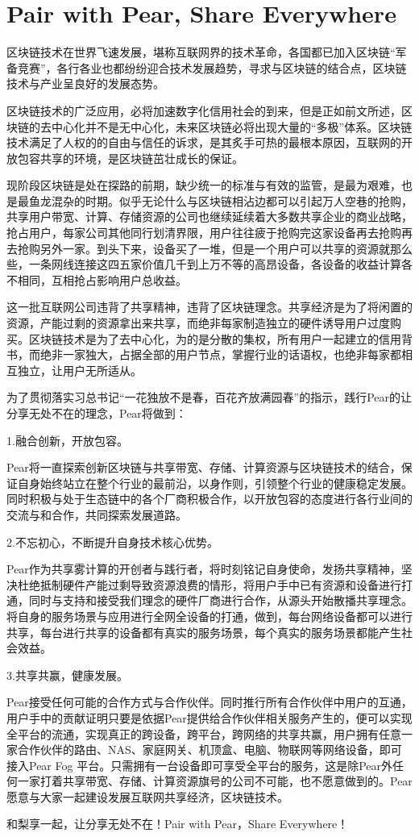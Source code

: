 \chapter{Pair with Pear, Share Everywhere}
区块链技术在世界飞速发展，堪称互联网界的技术革命，各国都已加入区块链“军备竞赛”，各行各业也都纷纷迎合技术发展趋势，寻求与区块链的结合点，区块链技术与产业呈良好的发展态势。\par
区块链技术的广泛应用，必将加速数字化信用社会的到来，但是正如前文所述，区块链的去中心化并不是无中心化，未来区块链必将出现大量的“多极”体系。区块链技术满足了人权的的自由与信任的诉求，是其炙手可热的最根本原因，互联网的开放包容共享的环境，是区块链茁壮成长的保证。\par 
现阶段区块链是处在探路的前期，缺少统一的标准与有效的监管，是最为艰难，也是最鱼龙混杂的时期。似乎无论什么与区块链相沾边都可以引起万人空巷的抢购，共享用户带宽、计算、存储资源的公司也继续延续着大多数共享企业的商业战略，抢占用户，每家公司其他同行划清界限，用户往往疲于抢购完这家设备再去抢购再去抢购另外一家。到头下来，设备买了一堆，但是一个用户可以共享的资源就那么些，一条网线连接这四五家价值几千到上万不等的高昂设备，各设备的收益计算各不相同，互相抢占影响用户总收益。\par 
这一批互联网公司违背了共享精神，违背了区块链理念。共享经济是为了将闲置的资源，产能过剩的资源拿出来共享，而绝非每家制造独立的硬件诱导用户过度购买。区块链技术是为了去中心化，为的是分散的集权，所有用户一起建立的信用背书，而绝非一家独大，占据全部的用户节点，掌握行业的话语权，也绝非每家都相互独立，让用户无所适从。\par
为了贯彻落实习总书记“一花独放不是春，百花齐放满园春”的指示，践行Pear的让分享无处不在的理念，Pear将做到：\par
1.融合创新，开放包容。\par
Pear将一直探索创新区块链与共享带宽、存储、计算资源与区块链技术的结合，保证自身始终站立在整个行业的最前沿，以身作则，引领整个行业的健康稳定发展。同时积极与处于生态链中的各个厂商积极合作，以开放包容的态度进行各行业间的交流与和合作，共同探索发展道路。\par 
2.不忘初心，不断提升自身技术核心优势。\par 
Pear作为共享雾计算的开创者与践行者，将时刻铭记自身使命，发扬共享精神，坚决杜绝抵制硬件产能过剩导致资源浪费的情形，将用户手中已有资源和设备进行打通，同时与支持和接受我们理念的硬件厂商进行合作，从源头开始散播共享理念。将自身的服务场景与应用进行全网全设备的打通，做到，每台网络设备都可以进行共享，每台进行共享的设备都有真实的服务场景，每个真实的服务场景都能产生社会效益。\par
3.共享共赢，健康发展。\par 
Pear接受任何可能的合作方式与合作伙伴。同时推行所有合作伙伴中用户的互通，用户手中的贡献证明只要是依据Pear提供给合作伙伴相关服务产生的，便可以实现全平台的流通，实现真正的跨设备，跨平台，跨网络的共享共赢，用户拥有任意一家合作伙伴的路由、NAS、家庭网关、机顶盒、电脑、物联网等网络设备，即可接入Pear Fog 平台。只需拥有一台设备即可享受全平台的服务，这是除Pear外任何一家打着共享带宽、存储、计算资源旗号的公司不可能，也不愿意做到的。Pear愿意与大家一起建设发展互联网共享经济，区块链技术。\par 
和梨享一起，让分享无处不在！Pair with Pear，Share Everywhere！